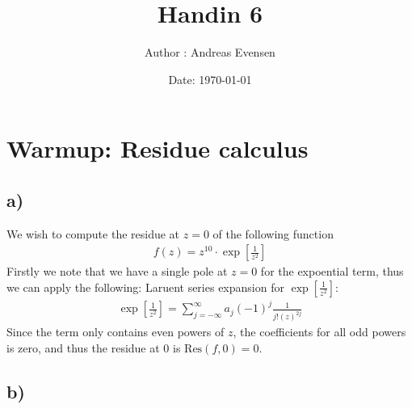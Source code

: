 \documentclass{article}
\title{Handin 6}
\author{Author : Andreas Evensen}
\date{Date: \today}
\newcommand{\res}[2]{\text{Res}(#1, #2)}
\begin{document}
\maketitle

\section{Warmup: Residue calculus}
\subsection*{a)}
We wish to compute the residue at $z = 0$ of the following function
\begin{align*}
    f(z) = z^{10}\cdot\exp\left[\frac{1}{z^2}\right]
\end{align*}
Firstly we note that we have a single pole at $z = 0$ for the expoential term, thus we can apply the following:
Laruent series expansion for $\exp\left[\frac{1}{z^2}\right]$:
\begin{align*}
    \exp\left[\frac{1}{z^2}\right] = \sum_{j = -\infty}^\infty a_j (-1)^j \frac{1}{j!(z)^{2j}}
\end{align*} Since the term only contains even powers of $z$, the coefficients for all odd powers is zero, and thus the residue at $0$ is $\res{f}{0}=0$.
\subsection*{b)}
\end{document}
